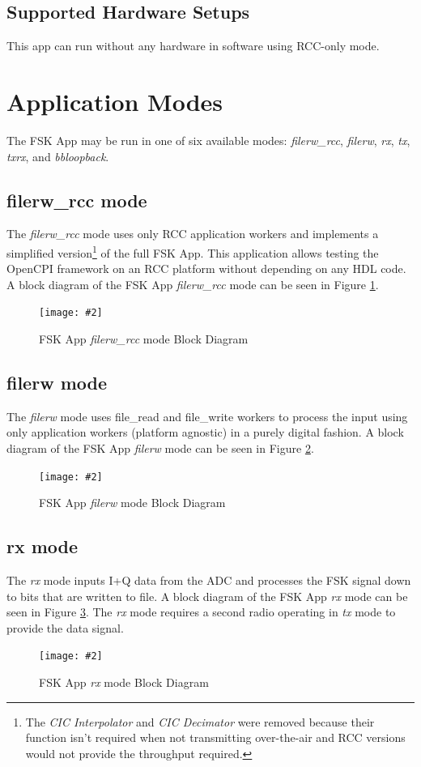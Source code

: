 \subsection{Supported Hardware Setups}
This app can run without any hardware in software using RCC-only mode.
\newpage %
\section{Application Modes}
The FSK App may be run in one of six available modes: \textit{filerw\_rcc}, \textit{filerw}, \textit{rx}, \textit{tx}, \textit{txrx}, and  \textit{bbloopback}.
\subsection{filerw\_rcc mode}
The \textit{filerw\_rcc} mode uses only RCC application workers and implements a simplified version\footnote{The \textit{CIC Interpolator} and \textit{CIC Decimator} were removed because their function isn't required when not transmitting over-the-air and RCC versions would not provide the throughput required.} of the full FSK App.
This application allows testing the OpenCPI framework on an RCC platform without depending on any HDL code.
A block diagram of the FSK App \textit{filerw\_rcc} mode can be seen in Figure \ref{fig:filerw_rcc_mode_block_diagram}.
\newcommand{\FSKAppModeFigure}[2]{
\begin{figure}[H]
  \centering
  \texttt{[image: \#2]}
  \caption{FSK App \textit{#1} mode Block Diagram}
  \label{fig:#2}
\end{figure}
}
\FSKAppModeFigure{filerw\_rcc}{filerw_rcc_mode_block_diagram}
\newpage\subsection{filerw mode}
The \textit{filerw} mode uses file\_read and file\_write workers to process the input using only application workers (platform agnostic) in a purely digital fashion.
A block diagram of the FSK App \textit{filerw} mode can be seen in Figure \ref{fig:filerw_mode_block_diagram}.
\FSKAppModeFigure{filerw}{filerw_mode_block_diagram}

\newpage\subsection{rx mode}
The \textit{rx} mode inputs I+Q data from the ADC and processes the FSK signal down to bits that are written to file.
A block diagram of the FSK App \textit{rx} mode can be seen in Figure \ref{fig:rx_mode_block_diagram}.
The \textit{rx} mode requires a second radio operating in \textit{tx} mode to provide the data signal.
\FSKAppModeFigure{rx}{rx_mode_block_diagram}

